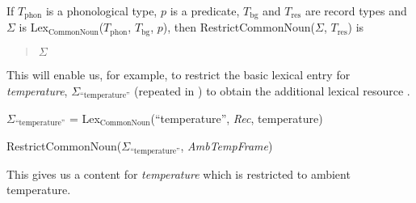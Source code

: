\begin{ex} 
If $T_{\mathrm{phon}}$ is a phonological type, $p$ is a predicate,
$T_{\mathrm{bg}}$ and $T_{\mathrm{res}}$ are record types and $\Sigma$
is Lex$_{\mathrm{CommonNoun}}$($T_{\mathrm{phon}}$, $T_{\mathrm{bg}}$,
$p$), then RestrictCommonNoun($\Sigma$, $T_{\mathrm{res}}$) is
\begin{quote}
$\Sigma$
\fbox{\d{$\wedge$}} 
\end{quote}
  
\end{ex} 
This will enable us, for example,  to restrict the basic lexical entry
for \textit{temperature}, $\Sigma_{\text{``temperature''}}$ (repeated in ) to obtain the
additional lexical resource \nexteg{b}.
\begin{ex} 
\begin{subex} 
 
\item $\Sigma_{\text{``temperature''}}$ = Lex$_{\mathrm{CommonNoun}}$(``temperature'', \textit{Rec}, temperature)
       
 
\item RestrictCommonNoun($\Sigma_{\text{``temperature''}}$, \textit{AmbTempFrame})
 
\end{subex} 
   
\end{ex}
This gives us a content for \textit{temperature} which is restricted
to ambient temperature.

